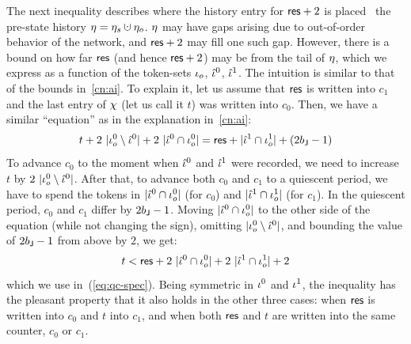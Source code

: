 The next inequality describes where the history entry for $\mathsf{res} + 2$
is placed \wrt~the pre-state history $\gist = \gists \hunion
\gisto$. $\eta$ may have gaps arising due to out-of-order behavior of
the network, and $\mathsf{res} + 2$ may fill one such gap. However, there is a
bound on how far $\mathsf{res}$ (and hence $\mathsf{res}+2$) may be from the tail of
$\eta$, which we express as a function of the token-sets $\iota_o$,
$\hat{\iota}^0$, $\hat{\iota}^1$. The intuition is similar to that of the bounds
in~\ref{cn:ai}. To explain it, let us assume that $\mathsf{res}$ is written
into $c_1$ and the last entry of $\chi$ (let us call it $t$) was
written into $c_0$. Then, we have a similar ``equation'' as in the
explanation in~\ref{cn:ai}:
\[
t + 2\ |\ikno^0 \setminus \iknh^0| + 2\ |\iknh^0 \cap \ikno^0| = \res
+ |\iknh^1 \cap \ikno^1| + (2 b_\joint -1)
\]
To advance $c_0$ to the moment when $\hat{\iota}^0$ and $\hat{\iota}^1$ were
recorded, we need to increase $t$ by $2\ |\iota_o^0 \setminus
\hat{\iota}^0|$. After that, to advance both $c_0$ and $c_1$ to a quiescent
period, we have to spend the tokens in $|\hat{\iota}^0 \cap \iota_o^0|$ (for
$c_0$) and $|\hat{\iota}^1 \cap \iota_o^1|$ (for $c_1$). In the quiescent
period, $c_0$ and $c_1$ differ by $2 b_{\mathsf{J}} - 1$. Moving $|\hat{\iota}^0
\cap \iota_o^0|$ to the other side of the equation (while not changing
the sign), omitting $|\iota_o^0 \setminus \hat{\iota}^0|$, and bounding the
value of $2 b_{\mathsf{J}} - 1$ from above by $2$, we get:
\[
t < \mathsf{res} + 2\ |\hat{\iota}^0 \cap \iota_o^0| + 2 \ |\hat{\iota}^1 \cap \iota_o^1| + 2
\]
which we use in~(\ref{eq:qc-spec}). Being symmetric in $\iota^0$ and
$\iota^1$, the inequality has the pleasant property that it also holds
in the other three cases: when $\mathsf{res}$ is written into $c_0$ and $t$
into $c_1$, and when both $\mathsf{res}$ and $t$ are written into the same
counter, $c_0$ or $c_1$.

% 

